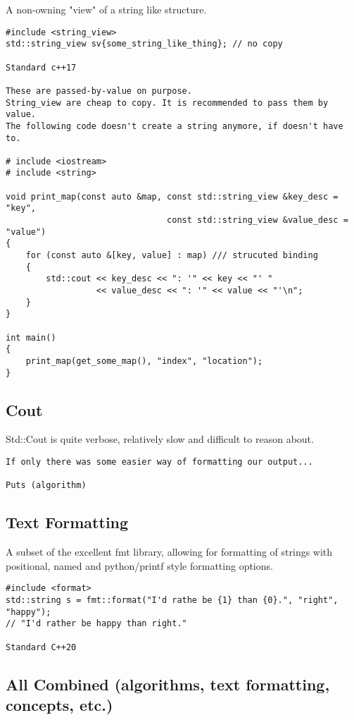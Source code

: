 \documentclass[openany]{report}
\begin{document}
A non-owning "view" of a string like structure.

\begin{verbatim}
#include <string_view>
std::string_view sv{some_string_like_thing}; // no copy

Standard c++17

These are passed-by-value on purpose.
String_view are cheap to copy. It is recommended to pass them by value.
The following code doesn't create a string anymore, if doesn't have to.

# include <iostream>
# include <string>

void print_map(const auto &map, const std::string_view &key_desc = "key",
                                const std::string_view &value_desc = "value")
{
    for (const auto &[key, value] : map) /// strucuted binding
    {
        std::cout << key_desc << ": '" << key << "' "
                  << value_desc << ": '" << value << "'\n";
    }
}

int main()
{
    print_map(get_some_map(), "index", "location");
}
\end{verbatim}

\subsection{Cout}

Std::Cout is quite verbose, relatively slow and difficult to reason about. 

\begin{verbatim}
If only there was some easier way of formatting our output...

Puts (algorithm)
\end{verbatim}

\subsection{Text Formatting}

A subset of the excellent {fmt} library, allowing for formatting of strings with positional,
named and python/printf style formatting options.

\begin{verbatim}
#include <format>
std::string s = fmt::format("I'd rathe be {1} than {0}.", "right", "happy");
// "I'd rather be happy than right."

Standard C++20
\end{verbatim}

\subsection{All Combined (algorithms, text formatting, concepts, etc.)}
\end{document}
